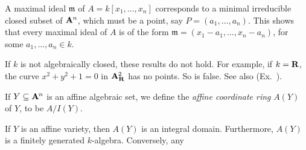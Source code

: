 { A maximal ideal $\mathfrak m$ of $A=k[x_1,\ldots,x_n]$ corresponds to a minimal irreducible closed subset of $\AffSpace{n}$, which must be a point, say $P=(a_1,\ldots,a_n)$. This shows that every maximal ideal of $A$ is of the form $\mathfrak m=(x_1-a_1,\ldots,x_n-a_n)$, for some $a_1,\ldots,a_n\in k$.

 If $k$ is not algebraically closed, these results do not hold. For example, if $k=\mathbf R$, the curve $x^2+y^2+1=0$ in $\AffSpace[\RR]{2}$ has no points. So  is false. See also (Ex.~).

\Dfn If $Y\subseteq\AffSpace{n}$ is an affine algebraic set, we define the \emph{affine coordinate ring} $A(Y)$ of $Y$, to be $A/I(Y)$.

 If $Y$ is an affine variety, then $A(Y)$ is an integral domain. Furthermore, $A(Y)$ is a finitely generated $k$-algebra. Conversely, any
}

